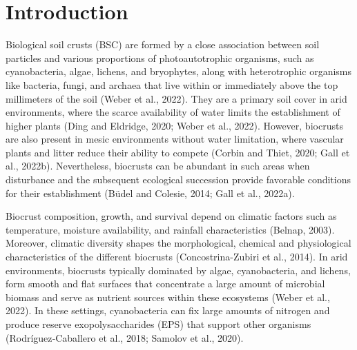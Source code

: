 \section{Introduction}

Biological soil crusts (BSC) are formed by a close association between soil particles and various proportions of photoautotrophic organisms, such as cyanobacteria, algae, lichens, and bryophytes, along with heterotrophic organisms like bacteria, fungi, and archaea that live within or immediately above the top millimeters of the soil (Weber et al., 2022). They are a primary soil cover in arid environments, where the scarce availability of water limits the establishment of higher plants (Ding and Eldridge, 2020; Weber et al., 2022). However, biocrusts are also present in mesic environments without water limitation, where vascular plants and litter reduce their ability to compete (Corbin and Thiet, 2020; Gall et al., 2022b). Nevertheless, biocrusts can be abundant in such areas when disturbance and the subsequent ecological succession provide favorable conditions for their establishment (Büdel and Colesie, 2014; Gall et al., 2022a).

Biocrust composition, growth, and survival depend on climatic factors such as temperature, moisture availability, and rainfall characteristics (Belnap, 2003). Moreover, climatic diversity shapes the morphological, chemical and physiological characteristics of the different biocrusts (Concostrina-Zubiri et al., 2014). In arid environments, biocrusts typically dominated by algae, cyanobacteria, and lichens, form smooth and flat surfaces that concentrate a large amount of microbial biomass and serve as nutrient sources within these ecosystems (Weber et al., 2022). In these settings, cyanobacteria can fix large amounts of nitrogen and produce reserve exopolysaccharides (EPS) that support other organisms (Rodríguez‐Caballero et al., 2018; Samolov et al., 2020).

